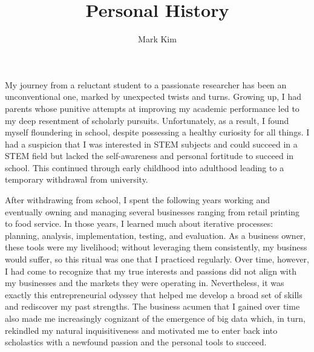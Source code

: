 \documentclass[12pt]{article}
\author{Mark Kim}
\title{Personal History}
\begin{document}
\maketitle

My journey from a reluctant student to a passionate researcher has been an unconventional one, marked by unexpected twists and turns. Growing
up, I had parents whose punitive attempts at improving my academic performance led to my deep resentment of scholarly pursuits.
Unfortunately, as a result, I found myself floundering in school, despite possessing a healthy curiosity for all things.
I had a suspicion that I was interested in STEM subjects and could succeed in a STEM field but lacked the self-awareness and personal
fortitude to succeed in school.  This continued through early childhood into adulthood leading to a temporary withdrawal from university.

After withdrawing from school, I spent the following years working and eventually owning and managing several businesses ranging from
retail printing to food service.  In those years, I learned much about iterative processes: planning, analysis, implementation, testing, and
evaluation.  As a business owner, these tools were my livelihood; without leveraging them consistently, my business would suffer, so this
ritual was one that I practiced regularly. Over time, however, I had come to recognize that my true interests and passions did not align
with my businesses and the markets they were operating in. Nevertheless, it was exactly this entrepreneurial odyssey that helped me develop
a broad set of skills and rediscover my past strengths.  The business acumen that I gained over time also made me increasingly cognizant of
the emergence of big data which, in turn, rekindled my natural inquisitiveness and motivated me to enter back into scholastics with a
newfound passion and the personal tools to succeed.
\end{document}
